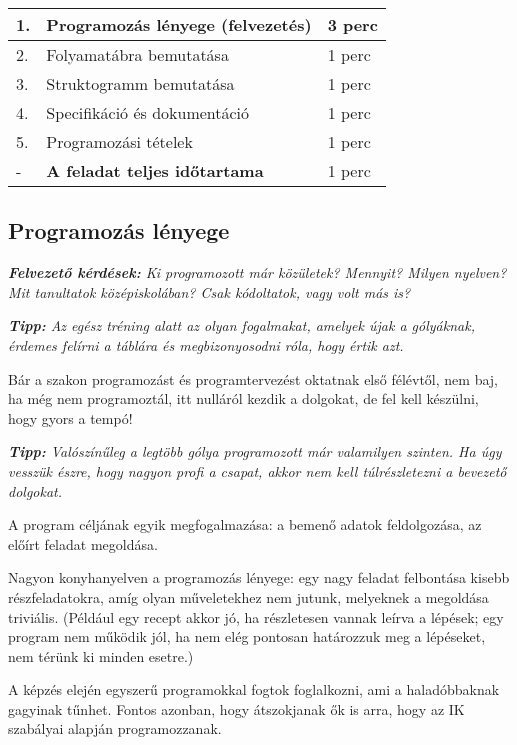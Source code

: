 \documentclass[../Main.tex]{subfiles}
\begin{document}
\begin{center}
    \begin{tabular}{| m{1.3 em} | m{} | m{} |}
    \hline
    1. & Programozás lényege (felvezetés) & 3 perc \\
    \hline
    2. & Folyamatábra bemutatása & 1 perc \\
    \hline
    3. & Struktogramm bemutatása & 1 perc \\
    \hline
    4. & Specifikáció és dokumentáció & 1 perc \\
    \hline
    5. & Programozási tételek & 1 perc \\
    \hline
    - & \textbf{A feladat teljes időtartama} & 1 perc \\
    \hline
    \end{tabular}
\end{center}

\subsection{Programozás lényege}
\textit{\textbf{Felvezető kérdések:} Ki programozott már közületek? Mennyit? Milyen nyelven?
Mit tanultatok középiskolában? Csak kódoltatok, vagy volt más is?}

\textit{\textbf{Tipp:} Az egész tréning alatt az olyan fogalmakat, amelyek 
újak a gólyáknak, érdemes felírni a táblára és megbizonyosodni róla, hogy értik azt.}

Bár a szakon programozást és programtervezést oktatnak első félévtől, nem baj,
ha még nem programoztál, itt nulláról kezdik a dolgokat, de fel kell készülni, hogy gyors a tempó!

\textit{\textbf{Tipp: } Valószínűleg a legtöbb gólya programozott már valamilyen szinten.
Ha úgy vesszük észre, hogy nagyon profi a csapat, akkor nem kell túlrészletezni a bevezető dolgokat.}

A program céljának egyik megfogalmazása: a bemenő adatok feldolgozása, az előírt feladat megoldása.

Nagyon konyhanyelven a programozás lényege: egy nagy feladat felbontása kisebb részfeladatokra,
 amíg olyan műveletekhez nem jutunk, melyeknek a megoldása triviális. (Például egy recept akkor jó,
 ha részletesen vannak leírva a lépések; egy program nem működik jól, ha nem elég pontosan határozzuk
 meg a lépéseket, nem térünk ki minden esetre.)

A képzés elején egyszerű programokkal fogtok foglalkozni, ami a haladóbbaknak gagyinak tűnhet.
Fontos azonban, hogy átszokjanak ők is arra, hogy az IK szabályai alapján programozzanak.
\end{document}
